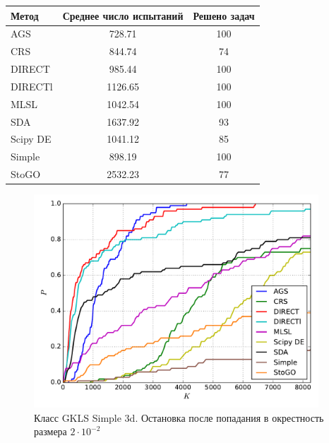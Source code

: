 \documentclass[a4paper]{article}
\begin{document}
\begin{tabular}{lcc}
\hline
 Метод    &  Среднее число испытаний  &  Решено задач  \\
\hline
 AGS      &          728.71           &      100       \\
 CRS      &          844.74           &       74       \\
 DIRECT   &          985.44           &      100       \\
 DIRECTl  &          1126.65          &      100       \\
 MLSL     &          1042.54          &      100       \\
 SDA      &          1637.92          &       93       \\
 Scipy DE &          1041.12          &       85       \\
 Simple   &          898.19           &      100       \\
 StoGO    &          2532.23          &       77       \\
\hline
\end{tabular}
\begin{figure}[H]
  \center
  \includegraphics[width=0.95\textwidth]{../experiments/gklss3d/cmc.pdf}
  \caption{Класс GKLS Simple 3d. Остановка после попадания в окрестность размера $2\cdot10^{-2}$}
  \label{fig:}
\end{figure}
\end{document}
